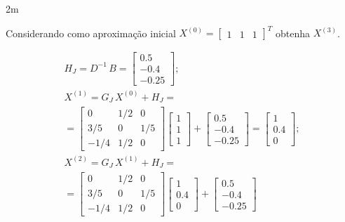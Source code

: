 \documentclass[CN_A-Tests_Resolutions.tex]{subfiles}
\begin{document}
\begin{questionBox}2m{} %

  Considerando como aproximação inicial \(X^{(0)} = \begin{bmatrix}1&1&1\end{bmatrix}^T\) obtenha \(X^{(3)}\).

  \answer{}

  \begin{gather}
    H_J=D^{-1}\,B
    =\begin{bmatrix}
      0.5\\-0.4\\-0.25
    \end{bmatrix}
    ; \\[1ex]
    X^{(1)}
    =G_J\,X^{(0)}+H_J
    = \\
    =\begin{bmatrix}
      0 & 1/2 & 0
      \\ 3/5 & 0 & 1/5
      \\ -1/4 & 1/2 & 0
    \end{bmatrix}
    \begin{bmatrix}
      1\\1\\1
    \end{bmatrix}
    + \begin{bmatrix}
      0.5\\-0.4\\-0.25
    \end{bmatrix}
    =\begin{bmatrix}
      1\\0.4\\0
    \end{bmatrix}
    ; \\[1ex]
    X^{(2)}
    =G_J\,X^{(1)}+H_J
    = \\
    =\begin{bmatrix}
      0 & 1/2 & 0
      \\ 3/5 & 0 & 1/5
      \\ -1/4 & 1/2 & 0
    \end{bmatrix}
    \begin{bmatrix}
      1\\0.4\\0
    \end{bmatrix}
    + \begin{bmatrix}
      0.5\\-0.4\\-0.25
    \end{bmatrix}

\end{gather}
\end{questionBox}
\end{document}
